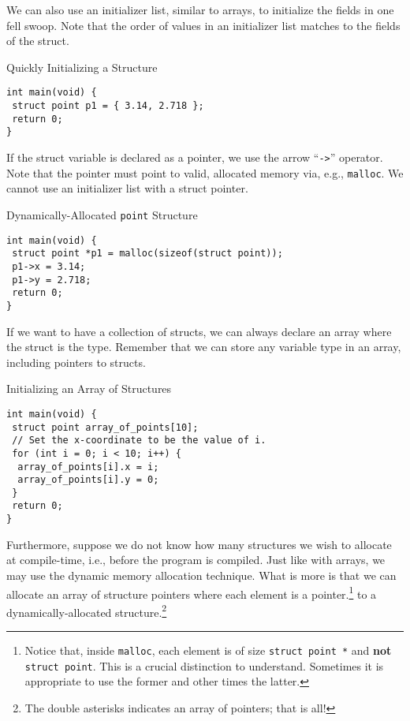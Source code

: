 We can also use an initializer list, similar to arrays, to initialize the fields in one fell swoop. Note that the order of values in an initializer list matches to the fields of the struct.

\begin{cl}[main.c]{Quickly Initializing a Structure}\begin{lstlisting}[language=MyC]
int main(void) {
 struct point p1 = { 3.14, 2.718 };
 return 0;
}
\end{lstlisting}\end{cl}

If the struct variable is declared as a pointer, we use the arrow ``\texttt{->}'' operator. Note that the pointer must point to valid, allocated memory via, e.g., \texttt{malloc}. We cannot use an initializer list with a struct pointer.

\begin{cl}[main.c]{Dynamically-Allocated \texttt{point} Structure}\begin{lstlisting}[language=MyC]
int main(void) {
 struct point *p1 = malloc(sizeof(struct point));
 p1->x = 3.14;
 p1->y = 2.718;
 return 0;
}
\end{lstlisting}\end{cl}

If we want to have a collection of structs, we can always declare an array where the struct is the type.
Remember that we can store any variable type in an array, including pointers to structs.

\begin{cl}[main.c]{Initializing an Array of Structures}\begin{lstlisting}[language=MyC]
int main(void) {
 struct point array_of_points[10];
 // Set the x-coordinate to be the value of i.
 for (int i = 0; i < 10; i++) {
  array_of_points[i].x = i;
  array_of_points[i].y = 0;
 }
 return 0;
}
\end{lstlisting}\end{cl}

Furthermore, suppose we do not know how many structures we wish to allocate at compile-time, i.e., before the program is compiled. Just like with arrays, we may use the dynamic memory allocation technique. What is more is that we can allocate an array of structure pointers where each element is a pointer.\footnote{Notice that, inside \texttt{malloc}, each element is of size \texttt{struct point *} and \textbf{not} \texttt{struct point}. This is a crucial distinction to understand. Sometimes it is appropriate to use the former and other times the latter.} to a dynamically-allocated structure.\footnote{The double asterisks \ttt{**} indicates an array of pointers; that is all!}

